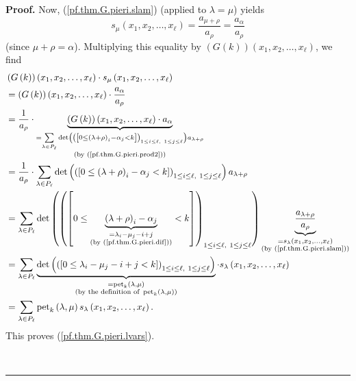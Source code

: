 \documentclass[numbers=enddot,12pt,final,onecolumn,notitlepage]{scrartcl}%
\theoremstyle{definition}
\newenvironment{proof}[1][Proof]{\noindent\textbf{#1.} }{\ \rule{0.5em}{0.5em}}
\let\sumnonlimits\sum
\renewcommand{\sum}{\sumnonlimits\limits}
\newenvironment{verlong}{}{}
\begin{document}
\begin{verlong}
\begin{proof}
Now, (\ref{pf.thm.G.pieri.slam}) (applied to $\lambda=\mu$) yields%
\[
s_{\mu}\left(  x_{1},x_{2},\ldots,x_{\ell}\right)  =\dfrac{a_{\mu+\rho}%
}{a_{\rho}}=\dfrac{a_{\alpha}}{a_{\rho}}%
\]
(since $\mu+\rho=\alpha$). Multiplying this equality by $\left(  G\left(
k\right)  \right)  \left(  x_{1},x_{2},\ldots,x_{\ell}\right)  $, we find%
\begin{align*}
&  \left(  G\left(  k\right)  \right)  \left(  x_{1},x_{2},\ldots,x_{\ell
}\right)  \cdot s_{\mu}\left(  x_{1},x_{2},\ldots,x_{\ell}\right) \\
&  =\left(  G\left(  k\right)  \right)  \left(  x_{1},x_{2},\ldots,x_{\ell
}\right)  \cdot\dfrac{a_{\alpha}}{a_{\rho}}\\
&  =\dfrac{1}{a_{\rho}}\cdot\underbrace{\left(  G\left(  k\right)  \right)
\left(  x_{1},x_{2},\ldots,x_{\ell}\right)  \cdot a_{\alpha}}_{\substack{=\sum
_{\lambda\in P_{\ell}}\det\left(  \left(  \left[  0\leq\left(  \lambda
+\rho\right)  _{i}-\alpha_{j}<k\right]  \right)  _{1\leq i\leq\ell,\ 1\leq
j\leq\ell}\right)  a_{\lambda+\rho}\\\text{(by (\ref{pf.thm.G.pieri.prod2}))}%
}}\\
&  =\dfrac{1}{a_{\rho}}\cdot\sum_{\lambda\in P_{\ell}}\det\left(  \left(
\left[  0\leq\left(  \lambda+\rho\right)  _{i}-\alpha_{j}<k\right]  \right)
_{1\leq i\leq\ell,\ 1\leq j\leq\ell}\right)  a_{\lambda+\rho}\\
&  =\sum_{\lambda\in P_{\ell}}\det\left(  \left(  \left[  0\leq
\underbrace{\left(  \lambda+\rho\right)  _{i}-\alpha_{j}}_{\substack{=\lambda
_{i}-\mu_{j}-i+j\\\text{(by (\ref{pf.thm.G.pieri.dif}))}}}<k\right]  \right)
_{1\leq i\leq\ell,\ 1\leq j\leq\ell}\right)  \underbrace{\dfrac{a_{\lambda
+\rho}}{a_{\rho}}}_{\substack{=s_{\lambda}\left(  x_{1},x_{2},\ldots,x_{\ell
}\right)  \\\text{(by (\ref{pf.thm.G.pieri.slam}))}}}\\
&  =\sum_{\lambda\in P_{\ell}}\underbrace{\det\left(  \left(  \left[
0\leq\lambda_{i}-\mu_{j}-i+j<k\right]  \right)  _{1\leq i\leq\ell,\ 1\leq
j\leq\ell}\right)  }_{\substack{=\operatorname*{pet}\nolimits_{k}\left(
\lambda,\mu\right)  \\\text{(by the definition of }\operatorname*{pet}%
\nolimits_{k}\left(  \lambda,\mu\right)  \text{)}}}\cdot s_{\lambda}\left(
x_{1},x_{2},\ldots,x_{\ell}\right) \\
&  =\sum_{\lambda\in P_{\ell}}\operatorname*{pet}\nolimits_{k}\left(
\lambda,\mu\right)  s_{\lambda}\left(  x_{1},x_{2},\ldots,x_{\ell}\right)  .
\end{align*}
This proves (\ref{pf.thm.G.pieri.lvars}).


\end{proof}
\end{verlong}
\end{document}
